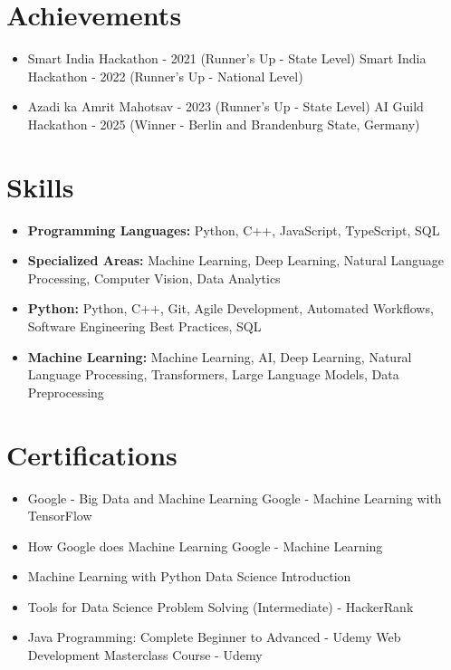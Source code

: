 \documentclass[a4paper,10pt]{article}
\begin{document}
\section*{Achievements}
\begin{itemize}
\item Smart India Hackathon - 2021 (Runner's Up - State Level) \hfill Smart India Hackathon - 2022 (Runner's Up - National Level)
\item Azadi ka Amrit Mahotsav - 2023 (Runner's Up - State Level) \hfill AI Guild Hackathon - 2025 (Winner - Berlin and Brandenburg State, Germany)
\end{itemize}

\section*{Skills}
\begin{itemize}
  \item \textbf{Programming Languages:} Python, C++, JavaScript, TypeScript, SQL
  \item \textbf{Specialized Areas:} Machine Learning, Deep Learning, Natural Language Processing, Computer Vision, Data Analytics
  \item \textbf{Python:} Python, C++, Git, Agile Development, Automated Workflows, Software Engineering Best Practices, SQL
  \item \textbf{Machine Learning:} Machine Learning, AI, Deep Learning, Natural Language Processing, Transformers, Large Language Models, Data Preprocessing
\end{itemize}

\section*{Certifications}
\begin{itemize}
\item Google - Big Data and Machine Learning \hfill Google - Machine Learning with TensorFlow
\item How Google does Machine Learning \hfill Google - Machine Learning
\item Machine Learning with Python \hfill Data Science Introduction
\item Tools for Data Science \hfill Problem Solving (Intermediate) - HackerRank
\item Java Programming: Complete Beginner to Advanced - Udemy \hfill Web Development Masterclass Course - Udemy
\end{itemize}
\end{document}
